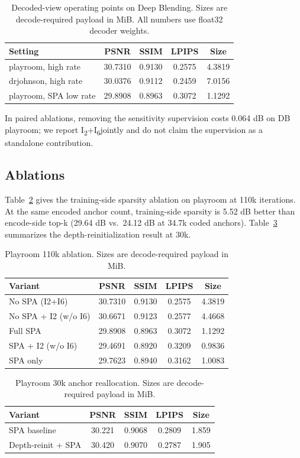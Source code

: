 \documentclass{article}
\newcommand{\Itwo}{I\textsubscript{2}}
\newcommand{\Isix}{I\textsubscript{6}}
\begin{document}
\begin{table}[t]
\centering
\caption{Decoded-view operating points on Deep Blending. Sizes are decode-required payload in MiB. All numbers use float32 decoder weights.}
\label{tab:db}
\begin{tabular}{lcccc}
\toprule
Setting & PSNR & SSIM & LPIPS & Size \\
\midrule
playroom, high rate & 30.7310 & 0.9130 & 0.2575 & 4.3819 \\
drjohnson, high rate & 30.0376 & 0.9112 & 0.2459 & 7.0156 \\
playroom, SPA low rate & 29.8908 & 0.8963 & 0.3072 & 1.1292 \\
\bottomrule
\end{tabular}
\end{table}

In paired ablations, removing the sensitivity supervision costs 0.064 dB on DB playroom; we report \Itwo+\Isix jointly and do not claim the supervision as a standalone contribution.

\subsection{Ablations}
Table~\ref{tab:spaab} gives the training-side sparsity ablation on playroom at 110k iterations. At the same encoded anchor count, training-side sparsity is 5.52 dB better than encode-side top-k (29.64 dB vs.\ 24.12 dB at 34.7k coded anchors). Table~\ref{tab:minisplat} summarizes the depth-reinitialization result at 30k.

\begin{table}[t]
\centering
\caption{Playroom 110k ablation. Sizes are decode-required payload in MiB.}
\label{tab:spaab}
\begin{tabular}{lcccc}
\toprule
Variant & PSNR & SSIM & LPIPS & Size \\
\midrule
No SPA (I2+I6) & 30.7310 & 0.9130 & 0.2575 & 4.3819 \\
No SPA + I2 (w/o I6) & 30.6671 & 0.9123 & 0.2577 & 4.4668 \\
Full SPA & 29.8908 & 0.8963 & 0.3072 & 1.1292 \\
SPA + I2 (w/o I6) & 29.4691 & 0.8920 & 0.3209 & 0.9836 \\
SPA only & 29.7623 & 0.8940 & 0.3162 & 1.0083 \\
\bottomrule
\end{tabular}
\end{table}

\begin{table}[t]
\centering
\caption{Playroom 30k anchor reallocation. Sizes are decode-required payload in MiB.}
\label{tab:minisplat}
\begin{tabular}{lcccc}
\toprule
Variant & PSNR & SSIM & LPIPS & Size \\
\midrule
SPA baseline & 30.221 & 0.9068 & 0.2809 & 1.859 \\
Depth-reinit + SPA & 30.420 & 0.9070 & 0.2787 & 1.905 \\
\bottomrule
\end{tabular}
\end{table}
\end{document}
